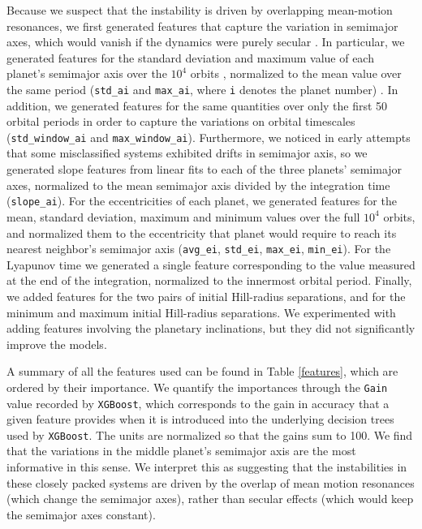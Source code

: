 Because we suspect that the instability is driven by overlapping mean-motion resonances, we first generated features that capture the variation in semimajor axes, which would vanish if the dynamics were purely secular \citep{Murray99}.  
In particular, we generated features for the standard deviation and maximum value of each planet's semimajor axis over the $10^4$ orbits , normalized to the mean value over the same period  ({\tt std\_ai} and {\tt max\_ai}, where {\tt i} denotes the planet number) .  
In addition, we generated features for the same quantities over only the first 50 orbital periods in order to capture the variations on orbital timescales ({\tt std\_window\_ai} and {\tt max\_window\_ai}).
Furthermore, we noticed in early attempts that some misclassified systems exhibited drifts in semimajor axis, so we generated slope features from linear fits to each of the three planets' semimajor axes, normalized to the mean semimajor axis divided by the integration time ({\tt slope\_ai}).
For the eccentricities of each planet, we generated features for the mean, standard deviation, maximum and minimum values over the full $10^4$ orbits, and normalized them to the eccentricity that planet would require to reach its nearest neighbor's semimajor axis ({\tt avg\_ei}, {\tt std\_ei}, {\tt max\_ei}, {\tt min\_ei}).
For the Lyapunov time we generated a single feature corresponding to the value measured at the end of the integration, normalized to the innermost orbital period.
Finally, we added features for the two pairs of initial Hill-radius separations, and for the minimum and maximum initial Hill-radius separations.
We experimented with adding features involving the planetary inclinations, but they did not significantly improve the models.

A summary of all the features used can be found in Table \ref{features}, which are ordered by their importance.
We quantify the importances through the {\tt Gain} value recorded by {\tt XGBoost}, which corresponds to the gain in accuracy that a given feature provides when it is introduced into the underlying decision trees used by {\tt XGBoost}.  
The units are normalized so that the gains sum to 100.
We find that the variations in the middle planet's semimajor axis are the most informative in this sense.
We interpret this as suggesting that the instabilities in these closely packed systems are driven by the overlap of mean motion resonances (which change the semimajor axes), rather than secular effects (which would keep the semimajor axes constant).

